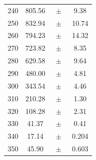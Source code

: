 \begin{table}[h]
\begin{tabular}{S[table-format=3.0]  S[table-format=3.2] @{}c @{}S[table-format=2.3]}
        240  & 805.56 &{$\;\pm\;$}& 9.38 \\
        250  & 832.94 &{$\;\pm\;$}& 10.74 \\
        260  & 794.23 &{$\;\pm\;$}& 14.32 \\
        270  & 723.82 &{$\;\pm\;$}& 8.35 \\
        280  & 629.58 &{$\;\pm\;$}& 9.64 \\
        290  & 480.00 &{$\;\pm\;$}& 4.81 \\
        300  & 343.54 &{$\;\pm\;$}& 4.46 \\
        310  & 210.28 &{$\;\pm\;$}& 1.30 \\
        320  & 108.28 &{$\;\pm\;$}& 2.31 \\
        330  & 41.37  &{$\;\pm\;$}& 0.41 \\
        340  & 17.14  &{$\;\pm\;$}& 0.204 \\
        350  & 45.90  &{$\;\pm\;$}& 0.603 \\ 
        \bottomrule
    \end{tabular}
\end{table}
\FloatBarrier
\noindent

